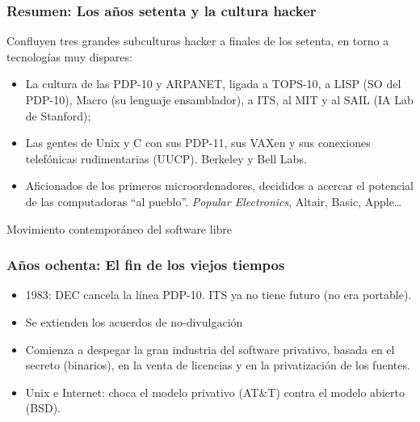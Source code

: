 \documentclass{beamer}
\begin{document}
\begin{frame}
\frametitle{Resumen: Los años setenta y la cultura hacker}

Confluyen tres grandes subculturas hacker a finales de los setenta, en torno a tecnologías muy dispares:

\begin{itemize}

\item \alert{La cultura de las PDP-10 y ARPANET}, ligada a TOPS-10, a LISP (SO del PDP-10), Macro (su lenguaje ensamblador), a ITS, al MIT y al SAIL (IA Lab de Stanford); 
\item \alert{Las gentes de Unix y C} con sus PDP-11, sus VAXen y sus conexiones telefónicas rudimentarias (UUCP). Berkeley y Bell Labs.
\item \alert{Aficionados de los primeros microordenadores}, decididos a acercar el potencial de las computadoras ``al pueblo''. \textit{Popular Electronics}, Altair, Basic, Apple\dots

\end{itemize}

\end{frame}


\begin{frame}

\begin{center}
\huge{Movimiento contemporáneo del software libre}
\end{center}

\end{frame}





\begin{frame}
\frametitle{Años ochenta: El fin de los viejos tiempos}

\begin{itemize}

\item 1983: DEC cancela la línea PDP-10. ITS ya no tiene futuro (no era portable). 
\item {Se extienden los acuerdos de no-divulgación}
\item {Comienza a despegar la gran industria del software privativo, basada en el
secreto (binarios), en la venta de licencias y en la privatización de los fuentes.}
\item Unix e Internet: choca el modelo privativo (AT\&T) contra el modelo abierto (BSD). 

\end{itemize}

\end{frame}
\end{document}
